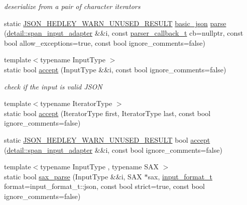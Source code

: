 \begin{DoxyCompactItemize}
\begin{DoxyCompactList}\small\item\em deserialize from a pair of character iterators \end{DoxyCompactList}\item 
static \hyperlink{json_8hpp_a28d7e3b2d26bd5b8a3806da3db7dea03}{J\+S\+O\+N\+\_\+\+H\+E\+D\+L\+E\+Y\+\_\+\+W\+A\+R\+N\+\_\+\+U\+N\+U\+S\+E\+D\+\_\+\+R\+E\+S\+U\+LT} \hyperlink{classnlohmann_1_1basic__json}{basic\+\_\+json} \hyperlink{classnlohmann_1_1basic__json_a73cf15644f04fa569f50291049d1bafd}{parse} (\hyperlink{classnlohmann_1_1detail_1_1span__input__adapter}{detail\+::span\+\_\+input\+\_\+adapter} \&\&i, const \hyperlink{classnlohmann_1_1basic__json_a0273d074462644e5d5a7ff313ad0d742}{parser\+\_\+callback\+\_\+t} cb=nullptr, const bool allow\+\_\+exceptions=true, const bool ignore\+\_\+comments=false)
\item 
{\footnotesize template$<$typename Input\+Type $>$ }\\static bool \hyperlink{classnlohmann_1_1basic__json_a32872afe5bfd040777e3e2bb85f0ca55}{accept} (Input\+Type \&\&i, const bool ignore\+\_\+comments=false)
\begin{DoxyCompactList}\small\item\em check if the input is valid J\+S\+ON \end{DoxyCompactList}\item 
{\footnotesize template$<$typename Iterator\+Type $>$ }\\static bool \hyperlink{classnlohmann_1_1basic__json_a47fb596473649332185aedb0a8a6ccc5}{accept} (Iterator\+Type first, Iterator\+Type last, const bool ignore\+\_\+comments=false)
\item 
static \hyperlink{json_8hpp_a28d7e3b2d26bd5b8a3806da3db7dea03}{J\+S\+O\+N\+\_\+\+H\+E\+D\+L\+E\+Y\+\_\+\+W\+A\+R\+N\+\_\+\+U\+N\+U\+S\+E\+D\+\_\+\+R\+E\+S\+U\+LT} bool \hyperlink{classnlohmann_1_1basic__json_a6d9e85910b91d02f6807b69b61690a4b}{accept} (\hyperlink{classnlohmann_1_1detail_1_1span__input__adapter}{detail\+::span\+\_\+input\+\_\+adapter} \&\&i, const bool ignore\+\_\+comments=false)
\item 
{\footnotesize template$<$typename Input\+Type , typename S\+AX $>$ }\\static bool \hyperlink{classnlohmann_1_1basic__json_a12b382c6407da5543827ce4b24bb5008}{sax\+\_\+parse} (Input\+Type \&\&i, S\+AX $\ast$sax, \hyperlink{namespacenlohmann_1_1detail_aa554fc6a11519e4f347deb25a9f0db40}{input\+\_\+format\+\_\+t} format=input\+\_\+format\+\_\+t\+::json, const bool strict=true, const bool ignore\+\_\+comments=false)

\end{DoxyCompactItemize}
